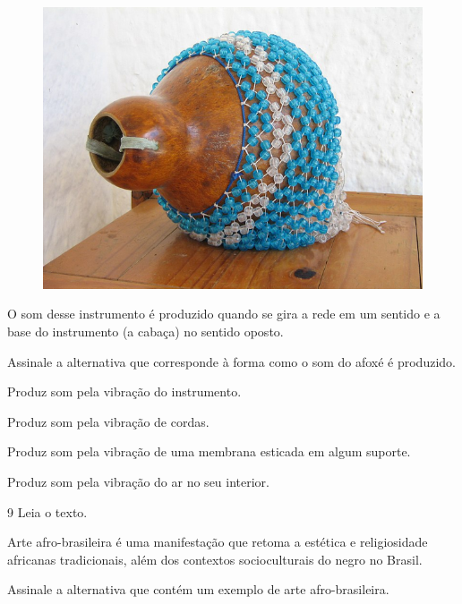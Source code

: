 \begin{figure}[htpb!]
\includegraphics[width=\textwidth]{./imgs/art33.png}
\end{figure}

O som desse instrumento é
produzido quando se gira a rede em um sentido e a base do instrumento (a
cabaça) no sentido oposto.

Assinale a alternativa que corresponde à forma como o som do afoxé é
produzido.

\begin{escolha}
\item
  Produz som pela vibração do instrumento.
\item
  Produz som pela vibração de cordas.
\item
  Produz som pela vibração de uma membrana esticada em algum suporte.
\item
  Produz som pela vibração do ar no seu interior.
\end{escolha}


\num{9}  Leia o texto.

Arte afro-brasileira é uma manifestação que retoma a estética e religiosidade africanas tradicionais, além dos contextos socioculturais do negro no Brasil.

Assinale a alternativa que contém um exemplo de arte afro-brasileira.

